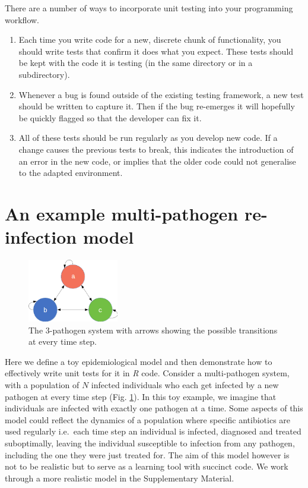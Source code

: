 \documentclass[
]{article}
\providecommand{\tightlist}{%
  \setlength{\itemsep}{0pt}\setlength{\parskip}{0pt}}
\begin{document}
There are a number of ways to incorporate unit testing into your programming workflow.

\begin{enumerate}
\def\labelenumi{\arabic{enumi}.}
\tightlist
\item
  Each time you write code for a new, discrete chunk of functionality, you should write tests that confirm it does what you expect. These tests should be kept with the code it is testing (in the same directory or in a subdirectory).
\item
  Whenever a bug is found outside of the existing testing framework, a new test should be written to capture it.
  Then if the bug re-emerges it will hopefully be quickly flagged so that the developer can fix it.
\item
  All of these tests should be run regularly as you develop new code.
  If a change causes the previous tests to break, this indicates the introduction of an error in the new code, or implies that the older code could not generalise to the adapted environment.
\end{enumerate}

\hypertarget{an-example-multi-pathogen-re-infection-model}{%
\section{An example multi-pathogen re-infection model}\label{an-example-multi-pathogen-re-infection-model}}

\begin{figure}[h]

{\centering \includegraphics[width=150px,]{figures/modelexample} 

}

\caption{The 3-pathogen system with arrows showing the possible transitions at every time step.}\label{fig:modelexample}
\end{figure}

Here we define a toy epidemiological model and then demonstrate how to effectively write unit tests for it in \emph{R} code.
Consider a multi-pathogen system, with a population of \(N\) infected individuals who each get infected by a new pathogen at every time step (Fig. \ref{fig:modelexample}).
In this toy example, we imagine that individuals are infected with exactly one pathogen at a time.
Some aspects of this model could reflect the dynamics of a population where specific antibiotics are used regularly i.e.~each time step an individual is infected, diagnosed and treated suboptimally, leaving the individual susceptible to infection from any pathogen, including the one they were just treated for.
The aim of this model however is not to be realistic but to serve as a learning tool with succinct code.
We work through a more realistic model in the Supplementary Material.
\end{document}
